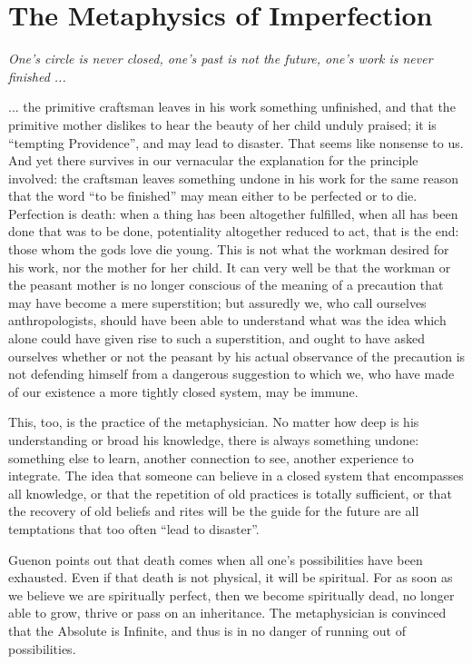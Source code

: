 \section{The Metaphysics of Imperfection}

\emph{One's circle is never closed, one's past is not the future, one's work is never finished ... }

\begin{quotex}
... the primitive craftsman leaves in his work something unfinished, and that the primitive mother dislikes to hear the beauty of her child unduly praised; it is ``tempting Providence'', and may lead to disaster. That seems like nonsense to us. And yet there survives in our vernacular the explanation for the principle involved: the craftsman leaves something undone in his work for the same reason that the word ``to be finished'' may mean either to be perfected or to die. Perfection is death: when a thing has been altogether fulfilled, when all has been done that was to be done, potentiality altogether reduced to act, that is the end: those whom the gods love die young. This is not what the workman desired for his work, nor the mother for her child. It can very well be that the workman or the peasant mother is no longer conscious of the meaning of a precaution that may have become a mere superstition; but assuredly we, who call ourselves anthropologists, should have been able to understand what was the idea which alone could have given rise to such a superstition, and ought to have asked ourselves whether or not the peasant by his actual observance of the precaution is not defending himself from a dangerous suggestion to which we, who have made of our existence a more tightly closed system, may be immune.
\end{quotex}


This, too, is the practice of the metaphysician. No matter how deep is his understanding or broad his knowledge, there is always something undone: something else to learn, another connection to see, another experience to integrate. The idea that someone can believe in a closed system that encompasses all knowledge, or that the repetition of old practices is totally sufficient, or that the recovery of old beliefs and rites will be the guide for the future are all temptations that too often ``lead to disaster''.

Guenon points out that death comes when all one's possibilities have been exhausted. Even if that death is not physical, it will be spiritual. For as soon as we believe we are spiritually perfect, then we become spiritually dead, no longer able to grow, thrive or pass on an inheritance. The metaphysician is convinced that the Absolute is Infinite, and thus is in no danger of running out of possibilities.


